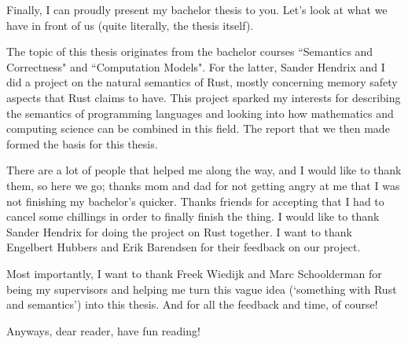 Finally, I can proudly present my bachelor thesis to you. 
Let's look at what we have in front of us (quite literally, the thesis itself).

The topic of this thesis originates from the bachelor courses ``Semantics and Correctness" and ``Computation Models". For the latter, Sander Hendrix and I did a project on the natural semantics of Rust, mostly concerning memory safety aspects that Rust claims to have. This project sparked my interests for describing the semantics of programming languages and looking into how mathematics and computing science can be combined in this field. The report that we then made formed the basis for this thesis. 

There are a lot of people that helped me along the way, and I would like to thank them, so here we go; thanks mom and dad for not getting angry at me that I was not finishing my bachelor's quicker. Thanks friends for accepting that I had to cancel some chillings in order to finally finish the thing. I would like to thank Sander Hendrix for doing the project on Rust together. I want to thank Engelbert Hubbers and Erik Barendsen for their feedback on our project.

Most importantly, I want to thank Freek Wiedijk and Marc Schoolderman for being my supervisors and helping me turn this vague idea (`something with Rust and semantics') into this thesis. And for all the feedback and time, of course!

Anyways, dear reader, have fun reading!


%

%




